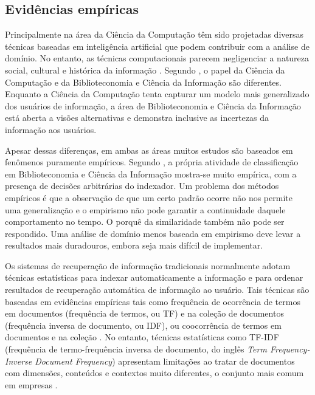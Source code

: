 \subsection{Evidências empíricas}%
\label{evidenciasEmpiricas}

Principalmente na área da Ciência da Computação têm sido projetadas diversas técnicas baseadas em inteligência artificial que podem contribuir com a análise de domínio. No entanto, as técnicas computacionais parecem negligenciar a natureza social, cultural e histórica da informação \cite{hjorland2002domain}. Segundo , o papel da Ciência da Computação e da Biblioteconomia e Ciência da Informação são diferentes. Enquanto a Ciência da Computação tenta capturar um modelo mais generalizado dos usuários de informação, a área de Biblioteconomia e Ciência da Informação está aberta a visões alternativas e demonstra inclusive as incertezas da informação aos usuários.

Apesar dessas diferenças, em ambas as áreas muitos estudos são baseados em fenômenos puramente empíricos. Segundo , a própria atividade de classificação em Biblioteconomia e Ciência da Informação mostra-se muito empírica, com a presença de decisões arbitrárias do indexador. Um problema dos métodos empíricos é que a observação de que um certo padrão ocorre não nos permite uma generalização e o empirismo não pode garantir a continuidade daquele comportamento no tempo. O porquê da similaridade também não pode ser respondido. Uma análise de domínio menos baseada em empirismo deve levar a resultados mais duradouros, embora seja mais difícil de implementar.

Os sistemas de recuperação de informação tradicionais normalmente adotam técnicas estatísticas para indexar automaticamente a informação e para ordenar resultados de recuperação automática de informação ao usuário. Tais técnicas são baseadas em evidências empíricas tais como frequência de ocorrência de termos em documentos (frequência de termos, ou TF) e na coleção de documentos (frequência inversa de documento, ou IDF), ou coocorrência de termos em documentos e na coleção \cite{salton88}. No entanto, técnicas estatísticas como TF-IDF (frequência de termo-frequência inversa de documento, do inglês \textit{Term Frequency-Inverse Document Frequency}) apresentam limitações ao tratar de documentos com dimensões, conteúdos e contextos muito diferentes, o conjunto mais comum em empresas \cite{difficultTRECtopics03,tfidf08}. 

